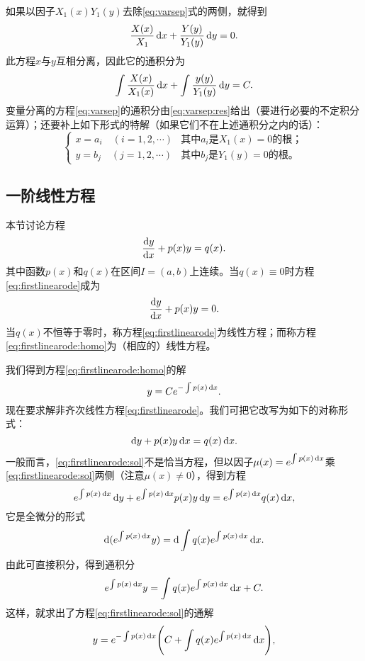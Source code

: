 如果以因子$X_1(x)Y_1(y)$去除\eqref{eq:varsep}式的两侧，就得到\[
\frac{X(x)}{X_1}\,\mathrm{d} x+\frac{Y(y)}{Y_1(y)}\,\mathrm{d} y=0.
\]
此方程$x$与$y$互相分离，因此它的通积分为
\begin{equation}\label{eq:varsep:res}
\int\frac{X(x)}{X_1(x)}\,\mathrm{d} x+\int\frac{y(y)}{Y_1(y)}\,\mathrm{d} y=C.
\end{equation}
变量分离的方程\eqref{eq:varsep}的通积分由\eqref{eq:varsep:res}给出（要进行必要的不定积分运算）；还要补上如下形式的特解（如果它们不在上述通积分之内的话）：
\begin{equation*}
    \begin{cases}
        x=a_i\quad(i=1,2,\cdots) & \text{其中$a_i$是$X_1(x)=0$的根；} \\
        y=b_j\quad(j=1,2,\cdots) & \text{其中$b_j$是$Y_1(y)=0$的根。}
    \end{cases}
\end{equation*}

\subsection{一阶线性方程}
本节讨论方程
\begin{equation}\label{eq:firstlinearode}
\frac{\mathrm{d}{}y}{\mathrm{d}{}x}+p(x)y=q(x).
\end{equation}
其中函数$p(x)$和$q(x)$在区间$I=(a,b)$上连续。当$q(x)\equiv0$时方程\eqref{eq:firstlinearode}成为
\begin{equation}\label{eq:firstlinearode:homo}
\frac{\mathrm{d}{}y}{\mathrm{d}{}x}+p(x)y=0.
\end{equation}
当$q(x)$不恒等于零时，称方程\eqref{eq:firstlinearode}为线性方程；而称方程\eqref{eq:firstlinearode:homo}为（相应的）线性方程。

我们得到方程\eqref{eq:firstlinearode:homo}的解
\begin{equation}\label{eq:firstlinearode:homo:sol}
y=Ce^{-\int p(x)\,\mathrm{d} x}.
\end{equation}
现在要求解非齐次线性方程\eqref{eq:firstlinearode}。我们可把它改写为如下的对称形式：
\begin{equation}\label{eq:firstlinearode:sol}
\mathrm{d} y+p(x)y\,\mathrm{d} x=q(x)\,\mathrm{d} x.
\end{equation}
一般而言，\eqref{eq:firstlinearode:sol}不是恰当方程，但以因子$\mu(x)=e^{\int p(x)\,\mathrm{d} x}$乘\eqref{eq:firstlinearode:sol}两侧（注意$\mu(x)\neq 0$），得到方程
\[
e^{\int p(x)\,\mathrm{d} x}\,\mathrm{d} y+e^{\int p(x)\,\mathrm{d} x}p(x)y\,\mathrm{d} y=e^{\int p(x)\,\mathrm{d} x}q(x)\,\mathrm{d} x,
\]
它是全微分的形式
\[
\mathrm{d}(e^{\int p(x)\,\mathrm{d} x}y)=\mathrm{d}\int q(x)e^{\int p(x)\,\mathrm{d} x}\,\mathrm{d} x.
\]
由此可直接积分，得到通积分
\[
e^{\int p(x)\,\mathrm{d} x}y=\int q(x)e^{\int p(x)\,\mathrm{d} x}\,\mathrm{d} x+C.
\]
这样，就求出了方程\eqref{eq:firstlinearode:sol}的通解
\begin{equation}\label{eq:firstlinearode:sol2}
y=e^{-\int p(x)\,\mathrm{d} x}\Bigg(C+\int q(x)e^{\int p(x)\,\mathrm{d} x}\,\mathrm{d} x\Bigg),
\end{equation}

